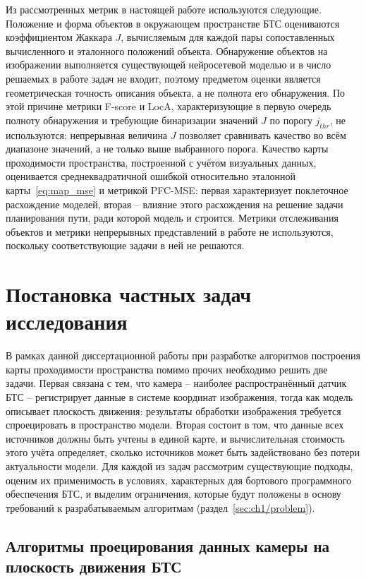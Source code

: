 Из рассмотренных метрик в настоящей работе используются следующие. Положение и форма объектов в окружающем пространстве БТС оцениваются коэффициентом Жаккара $J$, вычисляемым для каждой пары сопоставленных вычисленного и эталонного положений объекта. Обнаружение объектов на изображении выполняется существующей нейросетевой моделью и в число решаемых в работе задач не входит, поэтому предметом оценки является геометрическая точность описания объекта, а не полнота его обнаружения. По этой причине метрики F-score и LocA, характеризующие в первую очередь полноту обнаружения и требующие бинаризации значений $J$ по порогу $j_{thr}$, не используются: непрерывная величина $J$ позволяет сравнивать качество во всём диапазоне значений, а не только выше выбранного порога. Качество карты проходимости пространства, построенной с учётом визуальных данных, оценивается среднеквадратичной ошибкой относительно эталонной карты~\cref{eq:map_mse} и метрикой PFC-MSE: первая характеризует поклеточное расхождение моделей, вторая -- влияние этого расхождения на решение задачи планирования пути, ради которой модель и строится. Метрики отслеживания объектов и метрики непрерывных представлений в работе не используются, поскольку соответствующие задачи в ней не решаются.

\section{Постановка частных задач исследования}\label{sec:ch1/methods}

В рамках данной диссертационной работы при разработке алгоритмов построения карты проходимости пространства помимо прочих необходимо решить две задачи. Первая связана с тем, что камера -- наиболее распространённый датчик БТС -- регистрирует данные в системе координат изображения, тогда как модель описывает плоскость движения: результаты обработки изображения требуется спроецировать в пространство модели. Вторая состоит в том, что данные всех источников должны быть учтены в единой карте, и вычислительная стоимость этого учёта определяет, сколько источников может быть задействовано без потери актуальности модели. Для каждой из задач рассмотрим существующие подходы, оценим их применимость в условиях, характерных для бортового программного обеспечения БТС, и выделим ограничения, которые будут положены в основу требований к разрабатываемым алгоритмам (раздел~\cref{sec:ch1/problem}).

\subsection{Алгоритмы проецирования данных камеры на плоскость движения БТС}\label{sec:ch1/projection}

